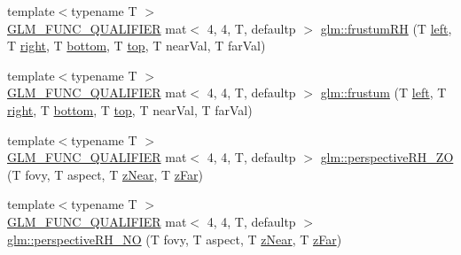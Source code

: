 \begin{DoxyCompactItemize}
\item 
{\footnotesize template$<$typename T $>$ }\\\hyperlink{setup_8hpp_a33fdea6f91c5f834105f7415e2a64407}{G\+L\+M\+\_\+\+F\+U\+N\+C\+\_\+\+Q\+U\+A\+L\+I\+F\+I\+ER} mat$<$ 4, 4, T, defaultp $>$ \hyperlink{group__gtc__matrix__transform_ga4366ab45880c6c5f8b3e8c371ca4b136}{glm\+::frustum\+RH} (T \hyperlink{_s_d_l__opengl__glext_8h_a85b8f6c07fbc1fb5d77c2ae090f21995}{left}, T \hyperlink{_s_d_l__opengl__glext_8h_a5ffadbbacc6b89cf6218bc43b384d3fe}{right}, T \hyperlink{_s_d_l__opengl__glext_8h_a95fc257e5ddf46f7db9d5e898cdf1991}{bottom}, T \hyperlink{_s_d_l__opengl__glext_8h_a5ab323daeacf8dfdb8f91132fecdca23}{top}, T near\+Val, T far\+Val)
\item 
{\footnotesize template$<$typename T $>$ }\\\hyperlink{setup_8hpp_a33fdea6f91c5f834105f7415e2a64407}{G\+L\+M\+\_\+\+F\+U\+N\+C\+\_\+\+Q\+U\+A\+L\+I\+F\+I\+ER} mat$<$ 4, 4, T, defaultp $>$ \hyperlink{group__gtc__matrix__transform_ga0bcd4542e0affc63a0b8c08fcb839ea9}{glm\+::frustum} (T \hyperlink{_s_d_l__opengl__glext_8h_a85b8f6c07fbc1fb5d77c2ae090f21995}{left}, T \hyperlink{_s_d_l__opengl__glext_8h_a5ffadbbacc6b89cf6218bc43b384d3fe}{right}, T \hyperlink{_s_d_l__opengl__glext_8h_a95fc257e5ddf46f7db9d5e898cdf1991}{bottom}, T \hyperlink{_s_d_l__opengl__glext_8h_a5ab323daeacf8dfdb8f91132fecdca23}{top}, T near\+Val, T far\+Val)
\item 
{\footnotesize template$<$typename T $>$ }\\\hyperlink{setup_8hpp_a33fdea6f91c5f834105f7415e2a64407}{G\+L\+M\+\_\+\+F\+U\+N\+C\+\_\+\+Q\+U\+A\+L\+I\+F\+I\+ER} mat$<$ 4, 4, T, defaultp $>$ \hyperlink{group__gtc__matrix__transform_ga4da358d6e1b8e5b9ae35d1f3f2dc3b9a}{glm\+::perspective\+R\+H\+\_\+\+ZO} (T fovy, T aspect, T \hyperlink{_s_d_l__opengl__glext_8h_a12d99226e590bbaaf0be69169eeb4834}{z\+Near}, T \hyperlink{_s_d_l__opengl__glext_8h_a1052a8235df129542aea6da80fbec6a1}{z\+Far})
\item 
{\footnotesize template$<$typename T $>$ }\\\hyperlink{setup_8hpp_a33fdea6f91c5f834105f7415e2a64407}{G\+L\+M\+\_\+\+F\+U\+N\+C\+\_\+\+Q\+U\+A\+L\+I\+F\+I\+ER} mat$<$ 4, 4, T, defaultp $>$ \hyperlink{group__gtc__matrix__transform_gad1526cb2cbe796095284e8f34b01c582}{glm\+::perspective\+R\+H\+\_\+\+NO} (T fovy, T aspect, T \hyperlink{_s_d_l__opengl__glext_8h_a12d99226e590bbaaf0be69169eeb4834}{z\+Near}, T \hyperlink{_s_d_l__opengl__glext_8h_a1052a8235df129542aea6da80fbec6a1}{z\+Far})
\item 

\end{DoxyCompactItemize}
